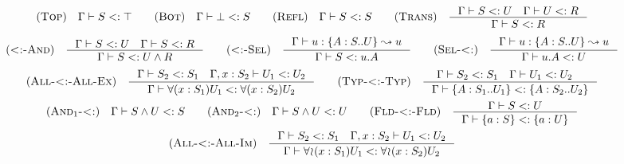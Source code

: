 \begin{minipage}{\textwidth} \[\begin{array}{c}
    \RULE{Top} \quad \SJ{\Gamma}{S}{\top} \qquad

    \RULE{Bot} \quad \SJ{\Gamma}{\bot}{S} \qquad

    \RULE{Refl} \quad \SJ{\Gamma}{S}{S} \qquad

    \RULE{Trans} \quad \inference{
        \SJ{\Gamma}{S}{U} \quad
        \SJ{\Gamma}{U}{R}
    }{
        \SJ{\Gamma}{S}{R}
    } \\[4mm]

    \RULE{<:-And} \quad \inference{
        \SJ{\Gamma}{S}{U} \quad
        \SJ{\Gamma}{S}{R}
    }{
        \SJ{\Gamma}{S}{\AGG{U}{R}}
    } \qquad

    \RULE{<:-Sel} \quad \inference{
        \TJ{\Gamma}{u}{\TDEC{A}{S}{U}}{u}
    }{
        \SJ{\Gamma}{S}{u.A}
    } \qquad

    \RULE{Sel-<:} \quad \inference{
        \TJ{\Gamma}{u}{\TDEC{A}{S}{U}}{u}
    }{
        \SJ{\Gamma}{u.A}{U}
    } \\[4mm]

    \RULE{All-<:-All-Ex} \quad \inference{
        \SJ{\Gamma}{S_2}{S_1} \quad
        \SJ{\Gamma, x: S_2}{U_1}{U_2}
    }{
        \SJ{\Gamma}{\DFUN{x}{S_1}{U_1}}{\DFUN{x}{S_2}{U_2}}
    } \qquad

    \RULE{Typ-<:-Typ} \quad \inference{
        \SJ{\Gamma}{S_2}{S_1} \quad
        \SJ{\Gamma}{U_1}{U_2} \quad
    }{
        \SJ{\Gamma}{\TDEC{A}{S_1}{U_1}}{\TDEC{A}{S_2}{U_2}}
    } \\[4mm]

    \RULE{And$_1$-<:} \quad \SJ{\Gamma}{\AGG{S}{U}}{S} \qquad

    \RULE{And$_2$-<:} \quad \SJ{\Gamma}{\AGG{S}{U}}{U} \qquad

    \RULE{Fld-<:-Fld} \quad \inference{
        \SJ{\Gamma}{S}{U}
    }{
        \SJ{\Gamma}{\FDEC{a}{S}}{\FDEC{a}{U}}
    } \\[4mm]

    \RULE{All-<:-All-Im} \quad \inference{
        \SJ{\Gamma}{S_2}{S_1} \quad
        \SJ{\Gamma, x: S_2}{U_1}{U_2}
    }{
        \SJ{\Gamma}{\IFUN{x}{S_1}{U_1}}{\IFUN{x}{S_2}{U_2}}
    }
\end{array}\] \end{minipage}
